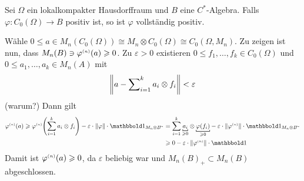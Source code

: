 \begin{proposition}[label=prop:318]
	Sei $\Omega$ ein lokalkompakter Hausdorffraum und $B$ eine $C^*$-Algebra.
	Falls $\varphi \colon C_0(\Omega) \to B$ positiv ist, so ist $\varphi$ vollständig positiv.
\end{proposition}
\begin{beweis}
	Wähle $0 \le a \in M_n(C_0(\Omega))\cong M_n \otimes C_0(\Omega) \cong C_0(\Omega,M_n)$.
	Zu zeigen ist nun, dass $M_n(B) \ni \varphi^\ssbrace{n}(a) \ge 0$.
	Zu $\varepsilon>0$ existieren $0 \le f_1, \ldots ,f_k \in  C_0(\Omega)$ und $0 \le a_1, \ldots ,a_k \in M_n(A)$ mit
	\[
		\norm*{a - \sum\nolimits_{i=1}^{k} a_i \otimes f_i} < \varepsilon
	\]
	(warum?)
	Dann gilt 
	\begin{align}
		\varphi^\ssbrace{n}(a) \ge \varphi^\ssbrace{n} \enbrace*{\sum_{i=1}^k a_i \otimes f_i} - \varepsilon \cdot \norm*{\varphi} \cdot \ind_{M_n \otimes B^\simm} &= \sum_{i=1}^{k} \Underbracket{a_i}{\ge 0} \otimes  \Underbracket{\varphi(f_i)}{\ge 0} - \varepsilon \cdot \norm*{\varphi^\ssbrace{n}} \cdot \ind_{M_n \otimes B^\simm} \\
		&\ge 0 - \varepsilon \cdot \norm*{\varphi^\ssbrace{n}} \cdot \ind
	\end{align}
	Damit ist $\varphi^\ssbrace{n}(a) \ge 0$, da $\varepsilon$ beliebig war und $M_n(B)_+ \subset M_n(B)$ abgeschlossen.
\end{beweis}

